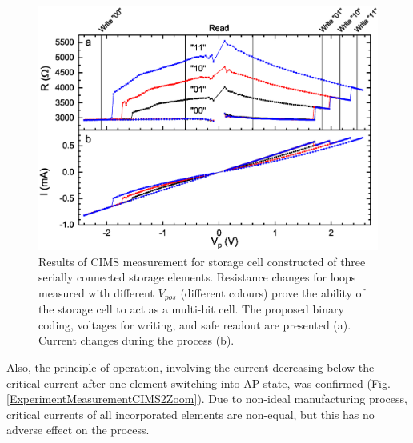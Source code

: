     \begin{figure}[H]
        \centering
        \includegraphics[width=0.7\paperwidth]{img/05/ResultsCIMS2.eps}
        \caption{Results of CIMS measurement for storage cell constructed of three serially connected storage elements. Resistance changes for loops measured with different $V_{pos}$ (different colours) prove the ability of the storage cell to act as a multi-bit cell. The proposed binary coding, voltages for writing, and safe readout are presented (a). Current changes during the process (b).}
        \label{ExperimentMeasurementCIMS2}
    \end{figure}
    
    Also, the principle of operation, involving the current decreasing below the critical current after one element switching into AP state, was confirmed (Fig. \ref{ExperimentMeasurementCIMS2Zoom}). Due to non-ideal manufacturing process, critical currents of all incorporated elements are non-equal, but this has no adverse effect on the process.
    
